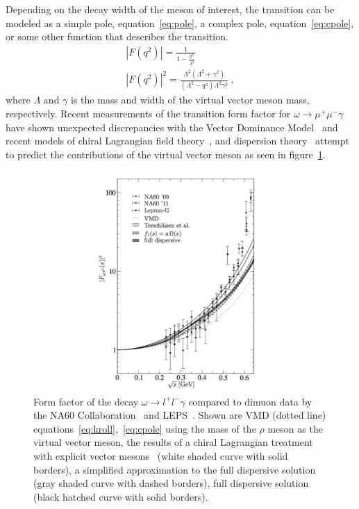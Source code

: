 \documentclass{aip-cp}
\begin{document}
 Depending on the decay width of the meson of interest, the transition can be modeled as a simple pole, equation~\ref{eq:pole}, a complex pole, equation~\ref{eq:cpole}, or some other function that describes the transition.
 \begin{eqnarray}
\left| F(q^2)\right| = \frac{1}{1-\frac{q^2}{\Lambda^2}} \label{eq:pole} \\
\left| F(q^2)\right|^2 = \frac{\Lambda^2(\Lambda^2 + \gamma^2)}{(\Lambda^2 - q^2)\Lambda^2 \gamma^2} \label{eq:cpole} \ ,
 \end{eqnarray} 
 where $\Lambda$ and $\gamma$ is the mass and width of the virtual vector meson mass, respectively.
 Recent measurements of the transition form factor for $\omega \to \mu^+\mu^- \gamma$ have shown unexpected discrepancies with the Vector Dominance Model~\cite{bib5} and recent models of chiral Lagrangian field theory~\cite{bib6}, and dispersion theory~\cite{Schneider} attempt to predict the contributions of the virtual vector meson as seen in figure~\ref{fig:omega_ff}.
 \begin{figure}[h!]
 	\centerline{\includegraphics[width=250 pt, height=130 pt]{figures/omega_ff_bastian_edit.pdf}}
 	\caption{Form factor of the decay $\omega \to l^+l^- \gamma$ compared to dimuon data by the NA60 Collaboration~\cite{bib5,bib5_0} and LEPS~\cite{LEPS}. Shown are VMD (dotted line) equations~\ref{eq:kroll},~\ref{eq:cpole} using the mass of the $\rho$ meson as the virtual vector meson, the results of a chiral Lagrangian treatment with explicit vector mesons~\cite{bib6} (white shaded curve with solid borders), a simplified approximation to the full dispersive solution~\cite{Schneider} (gray shaded curve with dashed borders), full dispersive solution~\cite{Schneider} (black hatched curve with solid borders).~\cite{Schneider}}
 	\label{fig:omega_ff}
 \end{figure}
 
\end{document}
